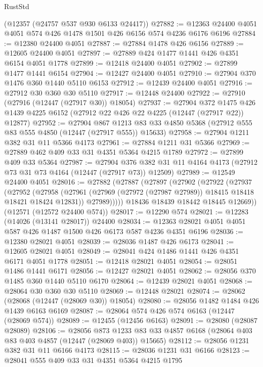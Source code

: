 \begin{lexlean}{RustStd}
\begin{coremodule}
    (@12357 (@24757 @537 @930 @6133 @24417))
@27882 := @12363 @24400 @4051 @4051 @574 @426 @1478 @1501 @426 @6156 @574 @4236 @6176 @6196
@27884 := @12380 @24400 @4051
@27887 := @27884 @1478 @426 @6156
@27889 := @12605 @24400 @4051
@27897 := @27889 @424 @1477 @1441 @426 @4351 @6154 @4051 @1778
@27899 := @12418 @24400 @4051
@27902 := @27899 @1477 @1441 @6154
@27904 := @12427 @24400 @4051
@27910 := @27904 @370 @1476 @360 @1440 @5110 @6153
@27912 := @12439 @24400 @4051
@27916 := @27912 @30 @360 @30 @5110
@27917 := @12448 @24400
@27922 := @27910 (@27916 (@12447 (@27917 @30)) @18054)
@27937 := @27904
    @372
    @1475
    @426
    @1439
    @4225
    @6152
    (@27912 @22 @426 @22 @4225 (@12447 (@27917 @22)) @12877)
@27952 := @27904
    @867
    @1213
    @83
    @33
    @4850
    @5368
    (@27912 @555 @83 @555 @4850 (@12447 (@27917 @555)) @15633)
@27958 := @27904 @1211 @382 @31 @11 @5366 @4173
@27961 := @27884 @1211 @31 @5366
@27969 := @27889 @462 @409 @33 @31 @4351 @5364 @4215 @1789
@27972 := @27899 @409 @33 @5364
@27987 := @27904
    @376
    @382
    @31
    @11
    @4164
    @4173
    (@27912 @73 @31 @73 @4164 (@12447 (@27917 @73)) @12509)
@27989 := @12549 @24400 @4051
@28016 := @27882
    (@27887
      (@27897
        (@27902
          (@27922
            (@27937
              (@27952
                (@27958
                  (@27961 (@27969 (@27972 (@27987 @27989)) @18415 @18418 @18421 @18424 @12831))
                  @27989)))))
        @18436
        @18439
        @18442
        @18445
        @12669))
    (@12571 (@12572 @24400 @574))
@28017 := @12290 @574
@28021 := @12283 (@14026 (@13141 @28017)) @24400
@28034 := @12363 @28021 @4051 @4051 @587 @426 @1487 @1500 @426 @6173 @587 @4236 @4351 @6196
@28036 := @12380 @28021 @4051
@28039 := @28036 @1487 @426 @6173
@28041 := @12605 @28021 @4051
@28049 := @28041 @424 @1486 @1441 @426 @4351 @6171 @4051 @1778
@28051 := @12418 @28021 @4051
@28054 := @28051 @1486 @1441 @6171
@28056 := @12427 @28021 @4051
@28062 := @28056 @370 @1485 @360 @1440 @5110 @6170
@28064 := @12439 @28021 @4051
@28068 := @28064 @30 @360 @30 @5110
@28069 := @12448 @28021
@28074 := @28062 (@28068 (@12447 (@28069 @30)) @18054)
@28080 := @28056 @1482 @1484 @426 @1439 @6163 @6169
@28087 := @28064 @574 @426 @574 @6163 (@12447 (@28069 @574))
@28089 := @12455 (@12456 @6163)
@28091 := @28080 (@28087 @28089)
@28106 := @28056
    @873
    @1233
    @83
    @33
    @4857
    @6168
    (@28064 @403 @83 @403 @4857 (@12447 (@28069 @403)) @15665)
@28112 := @28056 @1231 @382 @31 @11 @6166 @4173
@28115 := @28036 @1231 @31 @6166
@28123 := @28041 @555 @409 @33 @31 @4351 @5364 @4215 @1795

\end{coremodule}
\end{lexlean}
